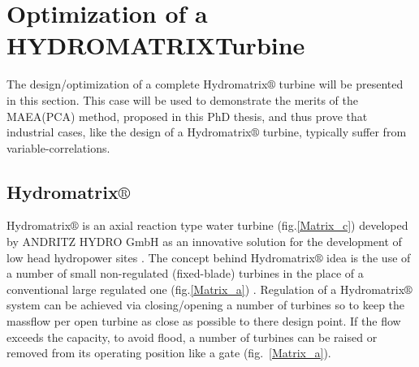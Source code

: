 \clearpage

\section{Optimization of a HYDROMATRIX\circledR Turbine}
\label{Matrix-case}
The design/optimization of a complete Hydromatrix$\circledR$ turbine will be presented in this section. This case will be used to demonstrate the merits of the MAEA(PCA) method, proposed in this PhD thesis, and thus prove that industrial cases, like the design of a  Hydromatrix$\circledR$ turbine, typically suffer from variable-correlations.   
\subsection{Hydromatrix$\circledR$}
Hydromatrix$\circledR$ is an axial reaction type water turbine (fig.\ref{Matrix_c}) developed by ANDRITZ HYDRO GmbH as an innovative solution for the development of low head hydropower sites \cite{matrix,matrix_2}. The concept behind Hydromatrix$\circledR$  idea is the use of a number of small non-regulated (fixed-blade) turbines in the place of a conventional large regulated one (fig.\ref{Matrix_a}) .  Regulation of a Hydromatrix$\circledR$ system can be achieved via closing/opening a number of turbines so to keep the massflow per open turbine as close as possible to there design point. If the flow exceeds the capacity, to avoid flood, a number of turbines can be raised or removed from its operating position like a gate (fig.~\ref{Matrix_a}).  


